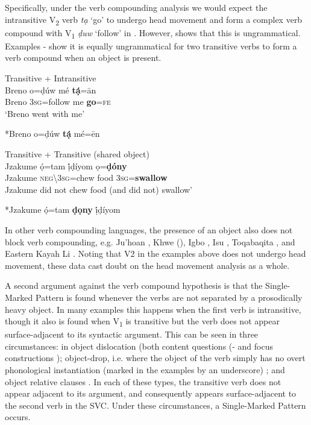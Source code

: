 \documentclass[output=paper]{langsci/langscibook}
\begin{document}
Specifically, under the verb compounding analysis we would expect the intransitive V\textsubscript{2} verb \textit{tạ} ‘go’ to undergo head movement and form a complex verb compound with V\textsubscript{1} \textit{ḍuw} ‘follow’ in . However,  shows that this is ungrammatical. Examples - show it is equally ungrammatical for two transitive verbs to form a verb compound when an object is present. 

\ea\label{ex:rolle:37}
{Transitive + Intransitive}\\
\gll   Breno   o=ḍúw    mé   \textbf{tạ́}=ān\\
     Breno   3\textsc{sg}=follow   me   \textbf{go}=\textsc{fe}\\
\glt ‘Breno went with me’ \citep[115]{Kari2004}
\z

\ea\label{ex:rolle:38}
  *Breno o=ḍúw  \textbf{tạ́}  mé=ēn\\
\z

\ea\label{ex:rolle:39}
{Transitive + Transitive (shared object)}\\
\gll   Jzakume   ọ́=tam      ị́ḍíyom  ọ=\textbf{ḍóny}\\
     Jzakume  \textsc{neg{\textbackslash}}3\textsc{sg}=chew  food  3\textsc{sg}=\textbf{swallow}\\
\glt Jzakume did not chew food (and did not) swallow’ \citep[110]{Kari2004}
\z


\ea\label{ex:rolle:40}
   *Jzakume  ọ́=tam  \textbf{ḍọny}  ị́ḍíyom\\
\z


In other verb compounding languages, the presence of an object also does not block verb compounding, e.g. Ju{\textbar}’hoan \citep{Collins2002}, Khwe (\citealt{KilianHatz2006}), Igbo \citep{Lord1975}, Isu \citep{Kießling2011}, Toqabaqita \citep{Lichtenberk2006,Lichtenberk2008}, and Eastern Kayah Li \citep{Solnit2006}. Noting that V2 in the examples above does not undergo head movement, these data cast doubt on the head movement analysis as a whole.

A second argument against the verb compound hypothesis is that the Single-Marked Pattern is found whenever the verbs are not separated by a prosodically heavy object. In many examples this happens when the first verb is intransitive, though it also is found when V\textsubscript{1} is transitive but the verb does not appear surface-adjacent to its syntactic argument. This can be seen in three circumstances: in object dislocation (both content questions (- and focus constructions ); object-drop, i.e. where the object of the verb simply has no overt phonological instantiation (marked in the examples by an underscore) ; and object relative clauses . In each of these types, the transitive verb does not appear adjacent to its argument, and consequently appears surface-adjacent to the second verb in the SVC. Under these circumstances, a Single-Marked Pattern occurs.
\end{document}
